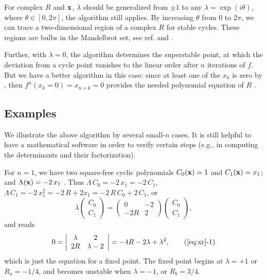 \documentclass[twocolumn]{revtex4-1}
\begin{document}
\begin{remark}[1]
  For complex $R$ and $\mathbf{x}$,
  $\lambda$ should be generalized from $\pm1$
  to any $\lambda = \exp(i\theta)$,
  where $\theta \in [0, 2\pi]$,
  the algorithm still applies.
  By increasing $\theta$ from 0 to $2\pi$,
  we can trace a two-dimensional region of a complex $R$
  for stable cycles.
  These regions are bulbs in the Mandelbrot set,
  see ref. \cite{stephenson} and .

  Further, with $\lambda = 0$,
  the algorithm determines the superstable point,
  at which the deviation from a cycle point vanishes
  to the linear order after $n$ iterations of $f$.
  But we have a better algorithm in this case:
  since at least one of the $x_k$ is zero by ,
  then $f^n(x_k = 0) = x_{n+k} = 0$ provides
  the needed polynomial equation of $R$ \cite{strogatz}.
\end{remark}





\subsection{\label{sec:examples}Examples}




We illustrate the above algorithm by several small-$n$ cases.
%
It is still helpful to have a mathematical software
  in order to verify certain steps
  (e.g., in computing the determinants and their factorization).



For $n = 1$, we have two square-free cyclic polynomials
  $C_0(\mathbf{x}) = 1$ and $C_1(\mathbf{x}) = x_1$;
  and $\Lambda(\mathbf{x}) = -2 \, x_1$
.
Thus $\Lambda \, C_0 = -2 \, x_1 = -2 \, C_1$,
$\Lambda \, C_1 = -2 \, x_1^2 = -2 \, R + 2 x_1 = -2 \, R \, C_0 + 2 \, C_1$,
or
\[
  \lambda
  \left( \begin{array}{c}
  C_0 \\
  C_1
  \end{array} \right)
  =
  \left( \begin{array}{cc}
  0     & -2 \\
  -2R   &  2
  \end{array}\right)
  \left( \begin{array}{c}
  C_0 \\
  C_1
  \end{array} \right),
\]
and  reads
\begin{equation}
0=  \left| \begin{array}{cc}
  \lambda     & 2          \\
  2 R         & \lambda - 2
  \end{array} \right| = -4R - 2\lambda + \lambda^2,
  \tag{\ref{eq:xr}-1}
\label{eq:xr1}
\end{equation}
which is just the equation for a fixed point.
The fixed point begins at $\lambda = +1$ or $R_a = -1/4$,
  and becomes unstable when $\lambda = -1$, or $R_b = 3/4$.
\end{document}
